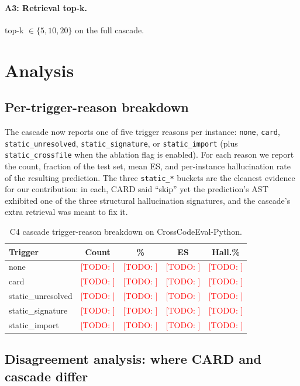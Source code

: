 \documentclass[10pt,twocolumn]{article}
\newcommand{\todo}[1]{\textcolor{red}{[TODO: #1]}}
\begin{document}
\paragraph{A3: Retrieval top-k.} top-k $\in \{5, 10, 20\}$ on the
full cascade.

\section{Analysis}
\label{sec:analysis}

\subsection{Per-trigger-reason breakdown}

The cascade now reports one of five trigger reasons per instance:
\texttt{none}, \texttt{card}, \texttt{static\_unresolved},
\texttt{static\_signature}, or \texttt{static\_import}
(plus \texttt{static\_crossfile} when the ablation flag is enabled).
For each reason we report the count, fraction of the test set, mean ES,
and per-instance hallucination rate of the resulting prediction. The
three \texttt{static\_*} buckets are the cleanest evidence for our
contribution: in each, CARD said ``skip'' yet the prediction's AST
exhibited one of the three structural hallucination signatures, and the
cascade's extra retrieval was meant to fix it.

\begin{table}[h]
\centering
\small
\begin{tabular}{lcccc}
\toprule
Trigger & Count & \% & ES & Hall.\% \\
\midrule
none                  & \todo{} & \todo{} & \todo{} & \todo{} \\
card                  & \todo{} & \todo{} & \todo{} & \todo{} \\
static\_unresolved    & \todo{} & \todo{} & \todo{} & \todo{} \\
static\_signature     & \todo{} & \todo{} & \todo{} & \todo{} \\
static\_import        & \todo{} & \todo{} & \todo{} & \todo{} \\
\bottomrule
\end{tabular}
\caption{C4 cascade trigger-reason breakdown on CrossCodeEval-Python.}
\label{tab:trigger_breakdown}
\end{table}

\subsection{Disagreement analysis: where CARD and cascade differ}
\end{document}
